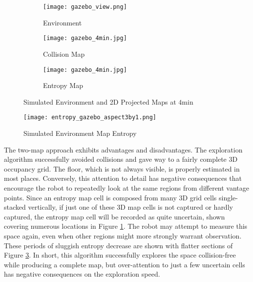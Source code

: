 \begin{figure}
	\centering
	\begin{subfigure}[t]{0.3\columnwidth}
           	\centering
          	\texttt{[image: gazebo\_view.png]}
        		\caption{Environment}
    	\end{subfigure}
		\hspace*{0.05cm}
    	\begin{subfigure}[t]{0.3\columnwidth}
           	\centering
          	\texttt{[image: gazebo\_4min.jpg]}
        		\caption{Collision Map}
    	\end{subfigure}
	\hspace*{0.1cm}
	\begin{subfigure}[t]{0.3\columnwidth}
           	\centering
          	\texttt{[image: gazebo\_4min.jpg]}
        		\caption{Entropy Map}
		\label{fig:sim2DmapsC}
    	\end{subfigure}
\caption{Simulated Environment and 2D Projected Maps at $4$min}
\label{fig:sim2Dmaps}
\end{figure}

\begin{figure}[!t]
	\centering
	\texttt{[image: entropy\_gazebo\_aspect3by1.png]}
	\caption{Simulated Environment Map Entropy}
	\label{fig:simH}
\end{figure}

The two-map approach exhibits advantages and disadvantages. The exploration algorithm successfully avoided collisions and gave way to a fairly complete 3D occupancy grid. The floor, which is not always visible, is properly estimated in most places. Conversely, this attention to detail has negative consequences that encourage the robot to repeatedly look at the same regions from different vantage points.
Since an entropy map cell is composed from many 3D grid cells single-stacked vertically, if just one of these 3D map cells is not captured or hardly captured, the entropy map cell will be recorded as quite uncertain, shown covering numerous locations in Figure \ref{fig:sim2DmapsC}. The robot may attempt to measure this space again, even when other regions might more strongly warrant observation. These periods of sluggish entropy decrease are shown with flatter sections of Figure \ref{fig:simH}. In short, this algorithm successfully explores the space collision-free while producing a complete map, but over-attention to just a few uncertain cells has negative consequences on the exploration speed.






